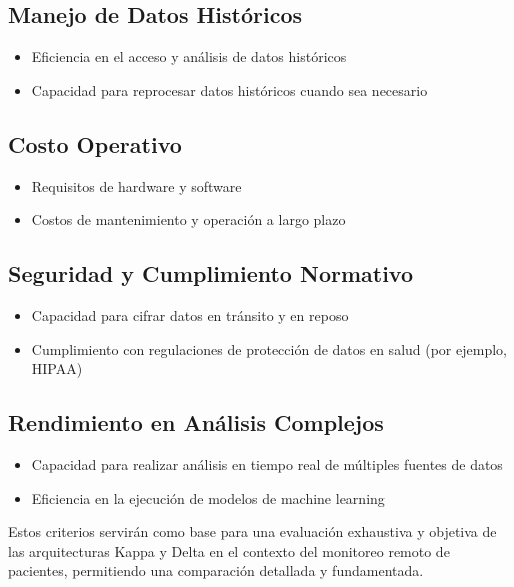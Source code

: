 \subsection{Manejo de Datos Históricos}
\begin{itemize}
    \item Eficiencia en el acceso y análisis de datos históricos
    \item Capacidad para reprocesar datos históricos cuando sea necesario
\end{itemize}

\subsection{Costo Operativo}
\begin{itemize}
    \item Requisitos de hardware y software
    \item Costos de mantenimiento y operación a largo plazo
\end{itemize}

\subsection{Seguridad y Cumplimiento Normativo}
\begin{itemize}
    \item Capacidad para cifrar datos en tránsito y en reposo
    \item Cumplimiento con regulaciones de protección de datos en salud (por ejemplo, HIPAA)
\end{itemize}

\subsection{Rendimiento en Análisis Complejos}
\begin{itemize}
    \item Capacidad para realizar análisis en tiempo real de múltiples fuentes de datos
    \item Eficiencia en la ejecución de modelos de machine learning
\end{itemize}

Estos criterios servirán como base para una evaluación exhaustiva y objetiva de las arquitecturas Kappa y Delta en el contexto del monitoreo remoto de pacientes, permitiendo una comparación detallada y fundamentada.
